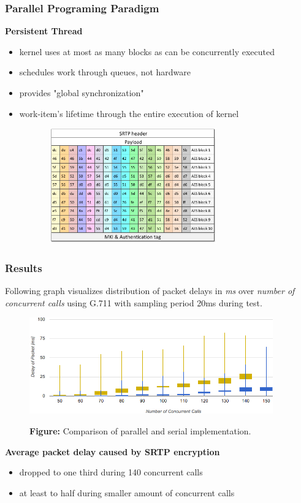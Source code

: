 \documentclass[10pt, xcolor=pdflatex, dvipsnames, table]{beamer}
\begin{document}
\begin{frame}
\frametitle{Parallel Programing Paradigm}
\textbf{Persistent Thread}
\begin{itemize}
\item kernel uses at most as many blocks as can be concurrently executed
\item schedules work through queues, not hardware
\item provides "global synchronization"
\item work-item's lifetime through the entire execution of kernel
\end{itemize}

\begin{figure}[H]
\centering
\includegraphics[width=9cm,height=5cm]{img/packet_wi.pdf}
\end{figure}
\end{frame}



\begin{frame}
\frametitle{Results}
\footnotesize{Following graph visualizes distribution of packet delays in \textit{ms} over
\textit{number of concurrent calls} using G.711 with sampling period 20ms during test.}

\begin{figure}[H]
\centering
\includegraphics[width=10.5cm,keepaspectratio]{img/compare.png}

\footnotesize{\textbf{Figure:} Comparison of parallel and serial implementation.}
\end{figure}

\textbf{Average packet delay caused by SRTP encryption}
  \begin{itemize}
    \item dropped to one third during 140 concurrent calls 
    \item at least to half during smaller amount of concurrent calls
  \end{itemize}
\end{frame}
\end{document}
